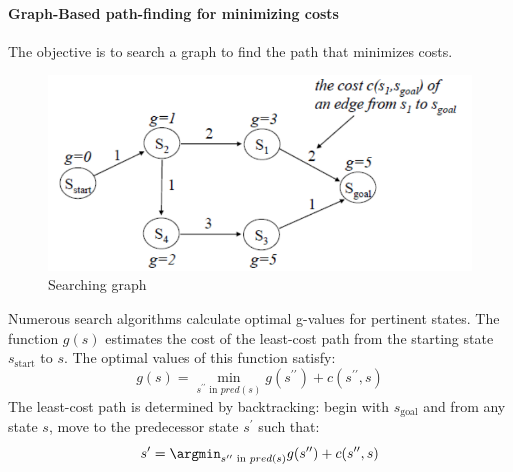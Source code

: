 \paragraph*{Graph-Based path-finding for minimizing costs}
The objective is to search a graph to find the path that minimizes costs.
\begin{figure}[H]
    \centering
    \includegraphics[width=0.75\linewidth]{images/sg.png}
    \caption{Searching graph}
\end{figure}
Numerous search algorithms calculate optimal g-values for pertinent states. 
The function $g(s)$ estimates the cost of the least-cost path from the starting state $s_{\text{start}}$ to $s$. 
The optimal values of this function satisfy:
\[g(s)=\min_{s^{\prime\prime} \text{ in }pred(s)}g(s^{\prime\prime})+c(s^{\prime\prime},s)\]
The least-cost path is determined by backtracking: begin with $s_{\text{goal}}$ and from any state $s$, move to the predecessor state $s^\prime$ such that:
\[s^\prime=\argmin_{s^{\prime\prime} \text{ in }pred(s)}g(s^{\prime\prime})+c(s^{\prime\prime},s)\]


